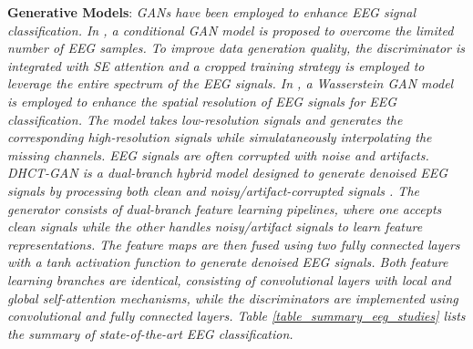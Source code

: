 \documentclass[preprint,12pt]{elsarticle}
\begin{document}
\textbf{Generative Models}: \emph{GANs have been employed to enhance EEG signal classification. In \citep{song_eeggan-net_2024}, a conditional GAN model is proposed  to overcome the limited number of EEG samples. To improve data generation quality, the discriminator is integrated with SE attention and a cropped training strategy is employed to leverage the entire spectrum of the EEG signals. In \citep{corley_deep_2025}, a Wasserstein GAN model is employed to enhance the spatial resolution of EEG signals for EEG classification. The model takes low-resolution signals and generates the corresponding high-resolution signals while simulataneously interpolating the missing channels. EEG signals are often corrupted with noise and artifacts. DHCT-GAN is a dual-branch hybrid model designed to generate denoised EEG signals by processing both clean and noisy/artifact-corrupted signals \citep{cai_dhct-gan_2025}. The generator consists of dual-branch feature learning pipelines, where one accepts clean signals while the other handles noisy/artifact signals to learn feature representations. The feature maps are then fused using two fully connected layers with a tanh activation function to generate denoised EEG signals. Both feature learning branches are identical, consisting of convolutional layers with local and global self-attention mechanisms, while the discriminators are implemented using convolutional and fully connected layers. Table \ref{table_summary_eeg_studies} lists the summary of state-of-the-art EEG classification.}
\end{document}
